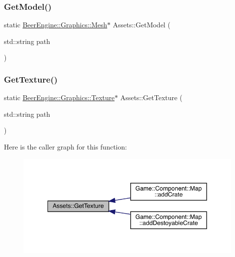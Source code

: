 \mbox{\label{class_assets_a2fcfb2c8c5a0ca4630230f4086b010f6}} 
\subsubsection{\texorpdfstring{Get\+Model()}{GetModel()}}
{\footnotesize\ttfamily static \mbox{\hyperlink{class_beer_engine_1_1_graphics_1_1_mesh}{Beer\+Engine\+::\+Graphics\+::\+Mesh}}$\ast$ Assets\+::\+Get\+Model (\begin{DoxyParamCaption}\item[{std\+::string}]{path }\end{DoxyParamCaption})\hspace{0.3cm}{\ttfamily [static]}}

\mbox{\label{class_assets_a1dc713408638d18566ec35221a0ede24}} 
\subsubsection{\texorpdfstring{Get\+Texture()}{GetTexture()}}
{\footnotesize\ttfamily static \mbox{\hyperlink{class_beer_engine_1_1_graphics_1_1_texture}{Beer\+Engine\+::\+Graphics\+::\+Texture}}$\ast$ Assets\+::\+Get\+Texture (\begin{DoxyParamCaption}\item[{std\+::string}]{path }\end{DoxyParamCaption})\hspace{0.3cm}{\ttfamily [static]}}

Here is the caller graph for this function\+:
\nopagebreak
\begin{figure}[H]
\begin{center}
\leavevmode
\includegraphics[width=342pt]{class_assets_a1dc713408638d18566ec35221a0ede24_icgraph}
\end{center}
\end{figure}
\mbox{\label{class_assets_a39f25e7a1853ac52ca5fcfdb676ace04}} 
